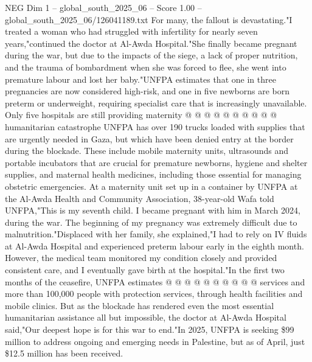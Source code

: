 \begin{textsample}{NEG Dim 1 – global\_south\_2025\_06 – Score 1.00 – global\_south\_2025\_06/126041189.txt}
For many, the fallout is devastating."I treated a woman who had struggled with infertility for nearly seven years,"continued the doctor at Al-Awda Hospital."She finally became pregnant during the war, but due to the impacts of the siege, a lack of proper nutrition, and the trauma of bombardment when she was forced to flee, she went into premature labour and lost her baby."UNFPA estimates that one in three pregnancies are now considered high-risk, and one in five newborns are born preterm or underweight, requiring specialist care that is increasingly unavailable.
Only five hospitals are still providing maternity @ @ @ @ @ @ @ @ @ @ humanitarian catastrophe UNFPA has over 190 trucks loaded with supplies that are urgently needed in Gaza, but which have been denied entry at the border during the blockade.
These include mobile maternity units, ultrasounds and portable incubators that are crucial for premature newborns, hygiene and shelter supplies, and maternal health medicines, including those essential for managing obstetric emergencies.
At a maternity unit set up in a container by UNFPA at the Al-Awda Health and Community Association, 38-year-old Wafa told UNFPA,"This is my seventh child.
I became pregnant with him in March 2024, during the war.
The beginning of my pregnancy was extremely difficult due to malnutrition."Displaced with her family, she explained,"I had to rely on IV fluids at Al-Awda Hospital and experienced preterm labour early in the eighth month.
However, the medical team monitored my condition closely and provided consistent care, and I eventually gave birth at the hospital."In the first two months of the ceasefire, UNFPA estimates @ @ @ @ @ @ @ @ @ @ services and more than 100,000 people with protection services, through health facilities and mobile clinics.
But as the blockade has rendered even the most essential humanitarian assistance all but impossible, the doctor at Al-Awda Hospital said,"Our deepest hope is for this war to end."In 2025, UNFPA is seeking \$99 million to address ongoing and emerging needs in Palestine, but as of April, just \$12.5 million has been received.

\end{textsample}
